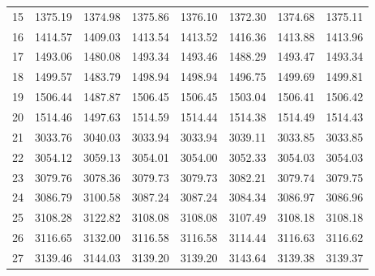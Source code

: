 \documentclass[10pt,oneside]{article}
\begin{document}
\begin{table}[h!]
\begin{tabular}{cccccccc}
15 &   1375.19 & 1374.98 & 1375.86 &    1376.10 &      1372.30 & 1374.68 &   1375.11 \\
16 &   1414.57 & 1409.03 & 1413.54 &    1413.52 &      1416.36 & 1413.88 &   1413.96 \\
17 &   1493.06 & 1480.08 & 1493.34 &    1493.46 &      1488.29 & 1493.47 &   1493.34 \\
18 &   1499.57 & 1483.79 & 1498.94 &    1498.94 &      1496.75 & 1499.69 &   1499.81 \\
19 &   1506.44 & 1487.87 & 1506.45 &    1506.45 &      1503.04 & 1506.41 &   1506.42 \\
20 &   1514.46 & 1497.63 & 1514.59 &    1514.44 &      1514.38 & 1514.49 &   1514.43 \\
21 &   3033.76 & 3040.03 & 3033.94 &    3033.94 &      3039.11 & 3033.85 &   3033.85 \\
22 &   3054.12 & 3059.13 & 3054.01 &    3054.00 &      3052.33 & 3054.03 &   3054.03 \\
23 &   3079.76 & 3078.36 & 3079.73 &    3079.73 &      3082.21 & 3079.74 &   3079.75 \\
24 &   3086.79 & 3100.58 & 3087.24 &    3087.24 &      3084.34 & 3086.97 &   3086.96 \\
25 &   3108.28 & 3122.82 & 3108.08 &    3108.08 &      3107.49 & 3108.18 &   3108.18 \\
26 &   3116.65 & 3132.00 & 3116.58 &    3116.58 &      3114.44 & 3116.63 &   3116.62 \\
27 &   3139.46 & 3144.03 & 3139.20 &    3139.20 &      3143.64 & 3139.38 &   3139.37 \\
\bottomrule
\end{tabular}
\end{table}
\end{document}
